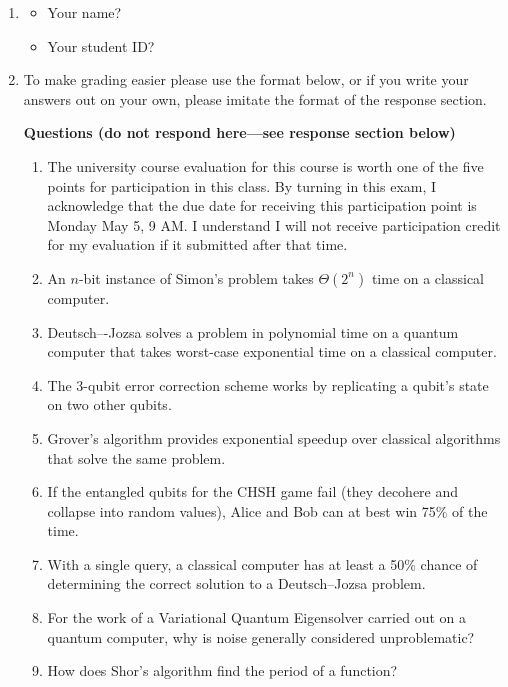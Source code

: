 \documentclass[12pt]{article}
\begin{document}
\begin{enumerate}
    \item{} \begin{itemize}
    \item Your name? \Blank[3in]{}
    \item Your student ID? \Blank[3in]{}
\end{itemize}

\item {} To make grading easier please use the format below, or if you write your answers out on your own, please imitate the format of the response section.

\textbf{Questions (do not respond here---see response section below)}
\begin{enumerate}[label=\theenumi.\arabic*]
   \item\label{tf:a} The university course evaluation for this course is worth one of the five points for
participation in this class. By turning in this exam, I acknowledge that the due
date for receiving this participation point is Monday May 5, 9 AM.  I understand I will not receive participation credit for my evaluation if it submitted after that time.

   \item\label{tf:d} An $n$-bit instance of Simon’s problem takes $\Theta(2^{n})$ time on a classical computer.
   \item\label{tf:e} Deutsch–-Jozsa solves a problem in polynomial time on a quantum computer that
takes worst-case exponential time on a classical computer.
   \item\label{tf:f} The 3-qubit error correction scheme works by replicating a qubit's state on two other qubits.
      \item\label{tf:g} Grover’s algorithm provides exponential speedup over classical algorithms that solve the same problem.
    \item\label{tf:h} If the entangled qubits for the CHSH game fail (they decohere and collapse into
random values), Alice and Bob can at best win 75\% of the time.
    \item\label{tf:i} With a single query, a classical computer has at least a 50\% chance of determining
the correct solution to a Deutsch–Jozsa problem.
    \item\label{tf:j}  For the work of a Variational Quantum Eigensolver carried out on a quantum computer, why is noise generally considered unproblematic?
       \item\label{tf:b} How does Shor's algorithm find the period of a function?
\end{enumerate}


\end{enumerate}
\end{document}
